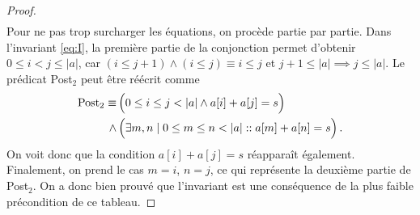 \documentclass{elsarticle}
\newcommand{\abs}[1]{\left\lvert#1\right\lvert}
\begin{document}
\begin{minipage}[c]{0.65\textwidth}
\begin{proof}
\begin{align*}
\end{align*}
Pour ne pas trop surcharger les équations, on procède partie par partie.
Dans l'invariant \ref{eq:I}, la première partie de la conjonction permet d'obtenir $0 \le i < j \le \abs{a}$,
car $(i \le j+1) \land (i \le j) \equiv i \le j$ et $j+1 \le \abs{a} \implies j \le \abs{a}$.
Le prédicat Post$_2$ peut être réécrit comme
\begin{align*}
\textnormal{Post}_2 \equiv&\,\Big(0 \le i \le j < \abs{a} \land a[i] + a[j] = s\Big)\\
\land&\,\Big(\exists m, n \mid 0 \le m \le n < \abs{a} :: a[m] + a[n] = s\Big)\,.
\end{align*}
On voit donc que la condition $a[i] + a[j] = s$ réapparaît également.
Finalement, on prend le cas $m = i$, $n = j$, ce qui représente la deuxième partie de Post$_2$.
 On a donc bien prouvé que l'invariant est une conséquence de la plus faible précondition de ce tableau.
\end{proof}
\end{minipage}
\end{document}
